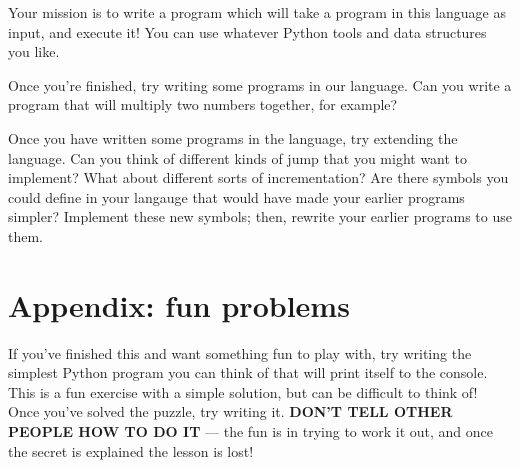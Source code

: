 \documentclass[12pt,draft]{article}
\begin{document}
Your mission is to write a program which will take a program in this language as
input, and execute it! You can use whatever Python tools and data structures you
like.\par

Once you're finished, try writing some programs in our language. Can you write a
program that will multiply two numbers together, for example?\par

Once you have written some programs in the language, try extending the language.
Can you think of different kinds of jump that you might want to implement? What
about different sorts of incrementation? Are there symbols you could define in
your langauge that would have made your earlier programs simpler? Implement
these new symbols; then, rewrite your earlier programs to use them.\par



\section*{Appendix: fun problems}

If you've finished this and want something fun to play with, try writing the
simplest Python program you can think of that will print itself to the console.
This is a fun exercise with a simple solution, but can be difficult to think of!
Once you've solved the puzzle, try writing it. \textbf{DON'T TELL OTHER PEOPLE HOW
TO DO IT} --- the fun is in trying to work it out, and once the secret is
explained the lesson is lost!\par
\end{document}
